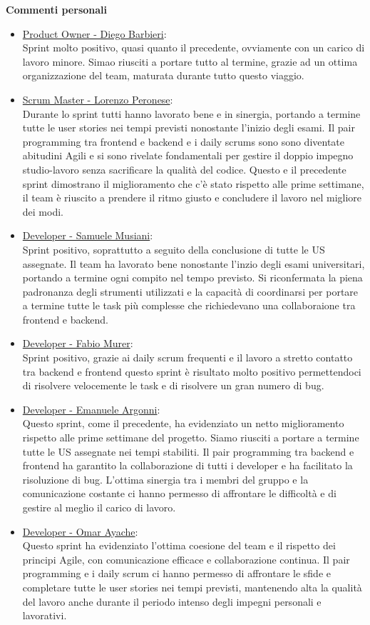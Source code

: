 \documentclass{article}
\begin{document}
\textbf{Commenti personali}
\begin{itemize}
    \item \underline{Product Owner - Diego Barbieri}: \\
    Sprint molto positivo, quasi quanto il precedente, ovviamente con un carico di lavoro minore. Simao riusciti a portare tutto al termine, 
    grazie ad un ottima organizzazione del team, maturata durante tutto questo viaggio.
    \item \underline{Scrum Master - Lorenzo Peronese}: \\
    Durante lo sprint tutti hanno lavorato bene e in sinergia, portando a termine tutte le user stories nei tempi previsti nonostante l'inizio degli esami. 
    Il pair programming tra frontend e backend e i daily scrums sono sono diventate abitudini Agili e si sono rivelate fondamentali per gestire 
    il doppio impegno studio-lavoro senza sacrificare la qualità del codice. Questo e il precedente sprint dimostrano il miglioramento 
    che c'è stato rispetto alle prime settimane, il team è riuscito a prendere il ritmo giusto e concludere il lavoro nel migliore dei modi.
    \item \underline{Developer - Samuele Musiani}: \\
    Sprint positivo, soprattutto a seguito della conclusione di tutte le US assegnate. Il team ha lavorato bene nonostante l'inzio degli esami universitari,
    portando a termine ogni compito nel tempo previsto. Si riconfermata la piena padronanza degli strumenti utilizzati e la capacità di coordinarsi per portare a termine
    tutte le task più complesse che richiedevano una collaboraione tra frontend e backend.
    \item \underline{Developer - Fabio Murer}: \\
    Sprint positivo, grazie ai daily scrum frequenti e il lavoro a stretto contatto tra backend e frontend questo sprint 
è risultato molto positivo permettendoci di risolvere velocemente le task e di risolvere un gran numero di bug.
    \item \underline{Developer - Emanuele Argonni}: \\
    Questo sprint, come il precedente, ha evidenziato un netto miglioramento rispetto alle prime settimane del progetto. Siamo riusciti a portare a termine tutte le US
    assegnate nei tempi stabiliti. Il pair programming tra backend e frontend ha garantito la collaborazione di tutti i developer e ha facilitato la risoluzione di bug.
    L'ottima sinergia tra i membri del gruppo e la comunicazione costante ci hanno permesso di affrontare le difficoltà e di gestire al meglio il carico di lavoro.
    \item \underline{Developer - Omar Ayache}:\\
    Questo sprint ha evidenziato l’ottima coesione del team e il rispetto dei principi Agile, con comunicazione efficace e collaborazione continua. Il pair programming e 
    i daily scrum ci hanno permesso di affrontare le sfide e completare tutte le user stories nei tempi previsti, mantenendo alta la qualità del lavoro anche durante 
    il periodo intenso degli impegni personali e lavorativi.
\end{itemize} 
\end{document}
